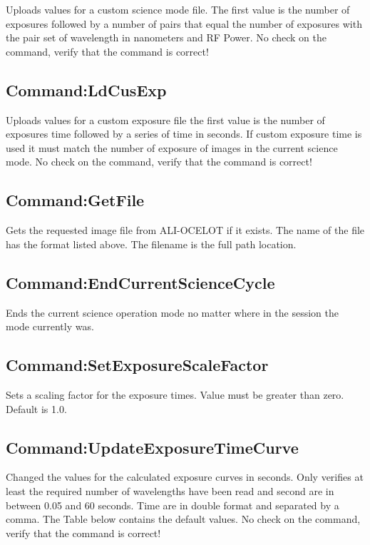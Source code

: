 Uploads values for a custom science mode file. The first value is the number of exposures followed by a number of pairs that equal the number of exposures with the pair set of wavelength in nanometers and RF Power. No check on the command, verify that the command is correct!

\subsection{Command:LdCusExp}

Uploads values for a custom exposure file the first value is the number of exposures time followed by a series of time in seconds. If custom exposure time is used it must match the number of exposure of images in the current science mode.  No check on the command, verify that the command is correct!

\subsection{Command:GetFile}

Gets the requested image file from ALI-OCELOT if it exists. The name of the file has the format listed above. The filename is the full path location.

\subsection{Command:EndCurrentScienceCycle}

Ends the current science operation mode no matter where in the session the mode currently was.

\subsection{Command:SetExposureScaleFactor}

Sets a scaling factor for the exposure times. Value must be greater than zero. Default is 1.0.

\subsection{Command:UpdateExposureTimeCurve}

Changed the values for the calculated exposure curves in seconds. Only verifies at least the required number of wavelengths have been read and second are in between 0.05 and 60 seconds. Time are in double format and separated by a comma. The Table below contains the default values.   No check on the command, verify that the command is correct!

